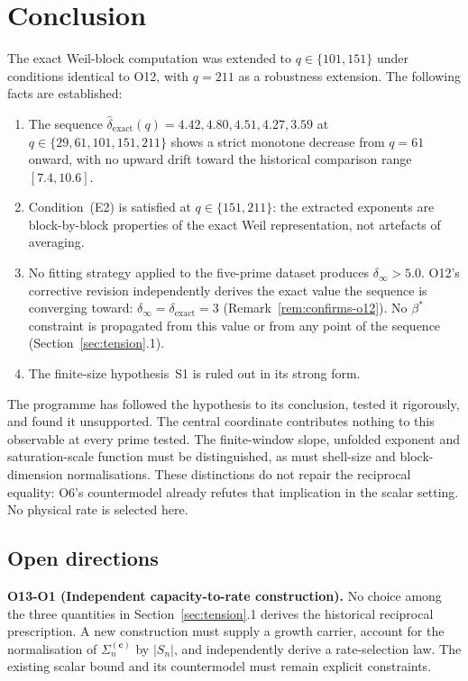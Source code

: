 \documentclass[11pt,a4paper]{article}
\theoremstyle{plain}
\theoremstyle{definition}
\newcommand{\dhat}{\hat\delta_{\mathrm{exact}}}
\newcommand{\bstar}{\beta^*}
\begin{document}
  \section{Conclusion}
  \label{sec:conclusion}

  The exact Weil-block computation was extended to $q \in \{101, 151\}$
  under conditions identical to O12, with $q = 211$ as a robustness extension.
  The following facts are established:

  \begin{enumerate}
    \item The sequence $\dhat(q) = 4.42, 4.80, 4.51, 4.27, 3.59$ at
    $q \in \{29, 61, 101, 151, 211\}$ shows a strict monotone decrease from
    $q = 61$ onward, with no upward drift toward the historical comparison range $[7.4, 10.6]$.
    \item Condition~(E2) is satisfied at $q \in \{151, 211\}$:
    the extracted exponents are block-by-block properties of the exact Weil
    representation, not artefacts of averaging.
    \item No fitting strategy applied to the five-prime dataset produces
    $\delta_\infty > 5.0$.
    O12's corrective revision independently derives the exact value the
    sequence is converging toward: $\delta_\infty=\delta_{\mathrm{exact}}=3$
    (Remark~\ref{rem:confirms-o12}).
    No $\bstar$ constraint is propagated from this value or from any point of
    the sequence (Section~\ref{sec:tension}.1).
    \item The finite-size hypothesis~S1 is ruled out in its strong form.
  \end{enumerate}

  The programme has followed the hypothesis to its conclusion, tested it
  rigorously, and found it unsupported.
  The central coordinate contributes nothing to this observable at every prime tested.
  The finite-window slope, unfolded exponent and saturation-scale function must be
  distinguished, as must shell-size and block-dimension normalisations.
  These distinctions do not repair the reciprocal equality: O6's countermodel already
  refutes that implication in the scalar setting.
  No physical rate is selected here.

  \subsection*{Open directions}
    \label{sec:open}

    \textbf{O13-O1 (Independent capacity-to-rate construction).}
    No choice among the three quantities in Section~\ref{sec:tension}.1 derives the
    historical reciprocal prescription.
    A new construction must supply a growth carrier, account for the normalisation
    of $\Sigma_n^{(\mathbf{c})}$ by $|S_n|$, and independently derive a rate-selection law.
    The existing scalar bound and its countermodel must remain explicit constraints.
\end{document}
